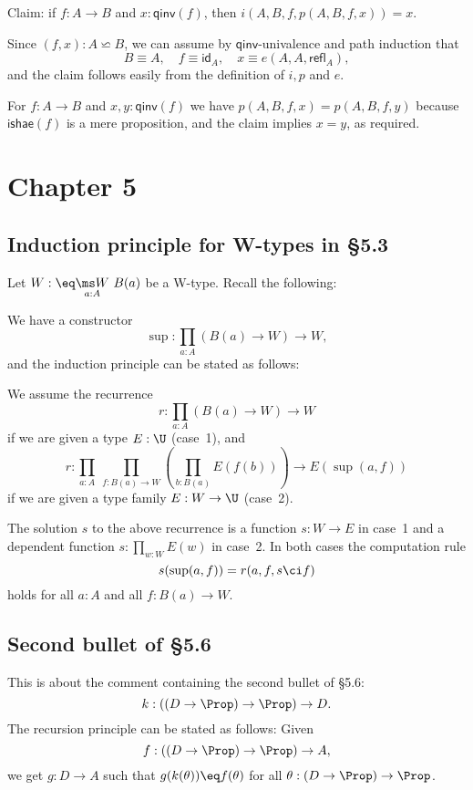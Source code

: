 \documentclass[12pt]{article}
\begin{document}
Claim: if $f:A\to B$ and $x:\mathsf{qinv}(f)$, then $i(A,B,f,p(A,B,f,x))=x$.
 
Since $(f,x):A\backsimeq B$, we can assume by $\mathsf{qinv}$-univalence and path induction that 
$$
B\equiv A,\quad f\equiv\mathsf{id}_A,\quad x\equiv e(A,A,\mathsf{refl}_A),
$$ 
and the claim follows easily from the definition of $i,p$ and $e$.

For $f:A\to B$ and $x,y:\mathsf{qinv}(f)$ we have $p(A,B,f,x)=p(A,B,f,y)$ because $\mathsf{ishae}(f)$ is a mere proposition, and the claim implies $x=y$, as required. 


\section{Chapter 5}

\subsection{Induction principle for W-types in \S5.3}%

Let $W:\eq\underset{a:A}{\ms W}\ B(a)$ be a W-type. Recall the following: 

We have a constructor 
$$
\sup:\prod_{a:A}\left(B(a)\to W\right)\to W, 
$$ 
and the induction principle can be stated as follows:

We assume the recurrence 
$$
r:\prod_{a:A}(B(a)\to W)\to W
$$ 
if we are given a type $E:\U$ (case~1), and 
$$
r:\prod_{a:A}\ \prod_{f:B(a)\to W}\left(\prod_{b:B(a)}E(f(b))\right)\to E(\sup(a,f))
$$ 
if we are given a type family $E:W\to\U$ (case~2). 

The solution $s$ to the above recurrence is a function $s:W\to E$ in case~1 and a dependent function $s:\prod_{w:W}E(w)$ in case~2. In both cases the computation rule 
$$
s(\sup(a,f))=r(a,f,s\ci f)
$$ 
holds for all $a:A$ and all $f:B(a)\to W$.


\subsection{Second bullet of \S5.6}%

This is about the comment containing the second bullet of \S5.6:
$$
k:((D\to\Prop)\to\Prop)\to D.
$$ 
The recursion principle can be stated as follows: Given 
$$
f:((D\to\Prop)\to\Prop)\to A,
$$ 
we get $g:D\to A$ such that $g(k(\theta))\eq f(\theta)$ for all $\theta:(D\to\Prop)\to\Prop$.
\end{document}
